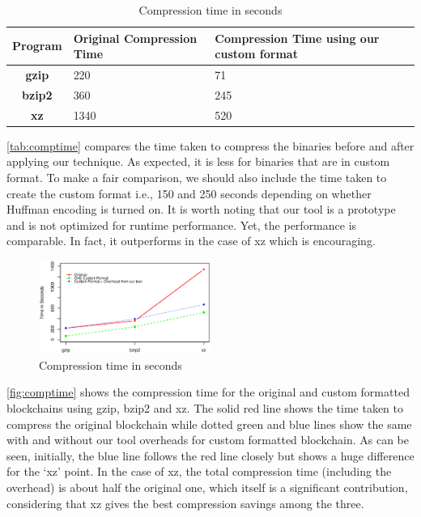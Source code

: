 \begin{table}[H]
	\centering
	\begin{tabular}{>{\bfseries}c | p{3cm} | p{3cm}} 
	Program & {Original Compression Time} & {Compression Time using our custom format} \\
	\hline
	gzip & 220  & 71 \\
	bzip2 & 360  & 245\\
	xz & 1340 & 520 \\
	\end{tabular}
	\caption{Compression time in seconds}
	\label{tab:comptime}
\end{table}
\autoref{tab:comptime} compares the time taken to compress the binaries before and after applying our technique. As expected, it is less for binaries that are in custom format. 
To make a fair comparison, we should also include the time taken to create the custom format i.e., 150 and 250 seconds depending on whether Huffman encoding is turned on.
It is worth noting that our tool is a prototype and is not optimized for runtime performance. 
Yet, the performance is comparable. 
In fact, it outperforms in the case of xz which is encouraging.
\begin{figure}[H]
	\centering
	\includegraphics[width=0.5\textwidth, scale=0.5]{plots/time.eps}
	\caption{Compression time in seconds}
	\label{fig:comptime}
\end{figure}
\autoref{fig:comptime} shows the compression time for the original and custom formatted blockchains using gzip, bzip2 and xz.
The solid red line shows the time taken to compress the original blockchain while 
dotted green and blue lines show the same with and without our tool
overheads for custom formatted blockchain. 
As can be seen, initially, the blue line follows the red line closely
but shows a huge difference for the `xz' point.
In the case of xz, the total compression time (including the overhead) is about half the original one, which itself is a significant contribution, considering that xz gives the best compression savings among the three.

